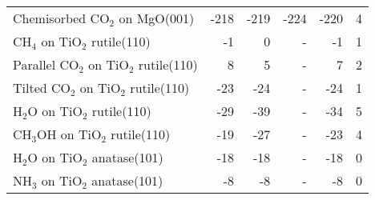 \begin{table}
\begin{adjustbox}{center,max width=1\textwidth}
\begin{tabular}{lrrrrr}
Chemisorbed CO$_2$ on MgO(001) & -218 & -219 & -224 & -220 & 4 \\
CH$_4$ on TiO$_2$ rutile(110) & -1 & 0 & - & -1 & 1 \\
Parallel CO$_2$ on TiO$_2$ rutile(110) & 8 & 5 & - & 7 & 2 \\
Tilted CO$_2$ on TiO$_2$ rutile(110) & -23 & -24 & - & -24 & 1 \\
H$_2$O on TiO$_2$ rutile(110) & -29 & -39 & - & -34 & 5 \\
CH$_3$OH on TiO$_2$ rutile(110) & -19 & -27 & - & -23 & 4 \\
H$_2$O on TiO$_2$ anatase(101) & -18 & -18 & - & -18 & 0 \\
NH$_3$ on TiO$_2$ anatase(101) & -8 & -8 & - & -8 & 0 \\
\bottomrule
\end{tabular}
\end{adjustbox}
\end{table}
